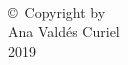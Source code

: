
\thispagestyle{empty}
\hbox{\ }

\vfill
\renewcommand{\baselinestretch}{1}
\small\normalsize

\vspace{-.65in}

\begin{center}
\large{\copyright \hbox{ }Copyright by\\
Ana Vald\'es Curiel %
\\
2019}
\end{center}

\vfill
